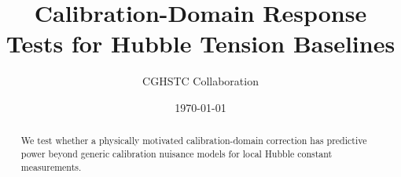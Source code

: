 \documentclass[12pt]{article}
\title{Calibration-Domain Response Tests for Hubble Tension Baselines}
\author{CGHSTC Collaboration}
\date{\today}
\begin{document}
\maketitle

\begin{abstract}
We test whether a physically motivated calibration-domain correction has predictive power
beyond generic calibration nuisance models for local Hubble constant measurements.
\end{abstract}










\end{document}
